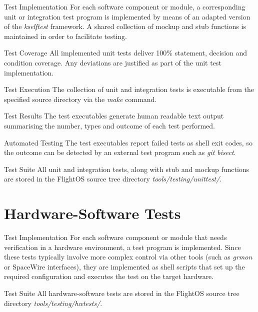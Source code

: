 {Test Implementation}{%
For each software component or module, a corresponding unit or integration test
program is implemented by means of an adapted version of the \emph{kselftest}
framework. A shared collection of mockup and stub functions is maintained in
order to facilitate testing.
}%
{}{}

{Test Coverage}{%
All implemented unit tests deliver 100\% statement, decision and condition
coverage. Any deviations are justified as part of the unit test implementation.
}%
{}{}

{Test Execution}{%
The collection of unit and integration tests is executable from the specified
source directory via the \emph{make} command.
}%
{}{}


{Test Results}{%
The test executables generate human readable text output summarising the number,
types and outcome of each test performed.
}%
{}{}


{\hspace{0pt} Automated  Testing}{%
The test executables report failed tests as shell exit codes, so the outcome
can be detected by an external test program such as \emph{git bisect}.
}%
{}{}

{Test Suite}{%
All unit and integration tests, along with stub and mockup functions are stored
in the FlightOS source tree directory \mbox{\emph{tools/testing/unittest/}}.
}%
{}{}



\section{Hardware-Software Tests}

{Test Implementation}{%
For each software component or module that needs verification in a hardware
environment, a test program is implemented.
}%
{}{Since these tests typically involve more complex control %
via other tools (such as \emph{grmon} or \gls{SpaceWire} interfaces), they are %
implemented as shell scripts that set up the required configuration and %
executes the test on the target hardware. %
}


{Test Suite}{%
All hardware-software tests are stored in the FlightOS source
tree directory \mbox{\emph{tools/testing/hwtests/}}.%
}%
{}{}


